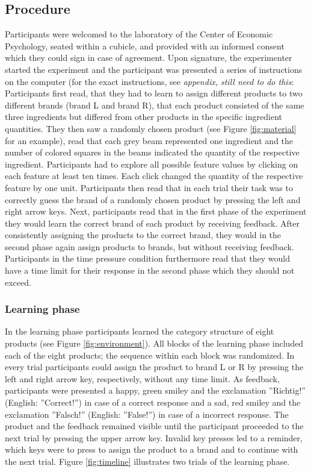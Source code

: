 \documentclass[a4paper,man,natbib]{apa6}
\begin{document}
\subsection{Procedure}
Participants were welcomed to the laboratory of the Center of Economic Psychology, seated within a cubicle, and provided with an informed consent which they could sign in case of agreement. Upon signature, the experimenter started the experiment and the participant was presented a series of instructions on the computer (for the exact instructions, see \textit{appendix, still need to do this}: Participants first read, that they had to learn to assign different products to two different brands (brand L and brand R), that each product consisted of the same three ingredients but differed from other products in the specific ingredient quantities. They then saw a randomly chosen product (see Figure \ref{fig:material} for an example), read that each grey beam represented one ingredient and the number of colored squares in the beams indicated the quantity of the respective ingredient. Participants had to explore all possible feature values by clicking on each feature at least ten times. Each click changed the quantity of the respective feature by one unit. Participants then read that in each trial their task was to correctly guess the brand of a randomly chosen product by pressing the left and right arrow keys. Next, participants read that in the first phase of the experiment they would learn the correct brand of each product by receiving feedback. After consistently assigning the products to the correct brand, they would in the second phase again assign products to brands, but without receiving feedback. Participants in the time pressure condition furthermore read that they would have a time limit for their response in the second phase which they should not exceed.

\subsubsection{Learning phase}
In the learning phase participants learned the category structure of eight products (see Figure \ref{fig:environment}). All blocks of the learning phase included each of the eight products; the sequence within each block was randomized. In every trial participants could assign the product to brand L or R by pressing the left and right arrow key, respectively, without any time limit. As feedback, participants were presented a happy, green smiley and the exclamation ''Richtig!'' (English: ''Correct!'') in case of a correct response and a sad, red smiley and the exclamation ''Falsch!'' (English: ''False!'') in case of a incorrect response. The product and the feedback remained visible until the participant proceeded to the next trial by pressing the upper arrow key. 
Invalid key presses led to a reminder, which keys were to press to assign the product to a brand and to continue with the next trial. 
Figure \ref{fig:timeline} illustrates two trials of the learning phase.
\end{document}
